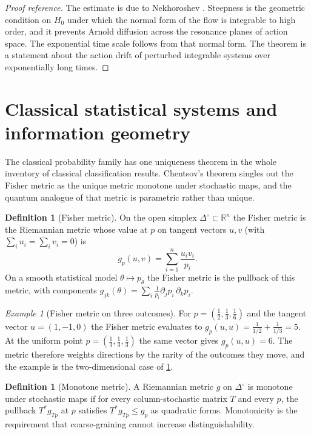 \documentclass[11pt,letterpaper]{article}
\theoremstyle{definition}
\newtheorem{definition}[theorem]{Definition}
\theoremstyle{remark}
\newtheorem{example}[theorem]{Example}
\begin{document}
\begin{proof}[Proof reference]
The estimate is due to Nekhoroshev \cite{nekhoroshev}. Steepness is the geometric condition on $H_0$ under which the normal form of the flow is integrable to high order, and it prevents Arnold diffusion across the resonance planes of action space. The exponential time scale follows from that normal form. The theorem is a statement about the action drift of perturbed integrable systems over exponentially long times.
\end{proof}

\section{Classical statistical systems and information geometry}

The classical probability family has one uniqueness theorem in the whole inventory of classical classification results. Chentsov's theorem singles out the Fisher metric as the unique metric monotone under stochastic maps, and the quantum analogue of that metric is parametric rather than unique.

\begin{definition}[Fisher metric]
\label{def:fisher}
On the open simplex $\Delta^{\circ} \subset \mathbb{R}^{n}$ the Fisher metric is the Riemannian metric whose value at $p$ on tangent vectors $u, v$ (with $\sum_i u_i = \sum_i v_i = 0$) is
\[
g_{p}(u, v) = \sum_{i=1}^{n} \frac{u_i v_i}{p_i}.
\]
On a smooth statistical model $\theta \mapsto p_{\theta}$ the Fisher metric is the pullback of this metric, with components $g_{jk}(\theta) = \sum_i \frac{1}{p_i} \partial_j p_i \, \partial_k p_i$.
\end{definition}

\begin{example}[Fisher metric on three outcomes]
\label{ex:fisher-three}
For $p = (\tfrac{1}{2}, \tfrac{1}{3}, \tfrac{1}{6})$ and the tangent vector $u = (1, -1, 0)$ the Fisher metric evaluates to $g_p(u, u) = \frac{1}{1/2} + \frac{1}{1/3} = 5$. At the uniform point $p = (\tfrac{1}{3}, \tfrac{1}{3}, \tfrac{1}{3})$ the same vector gives $g_p(u, u) = 6$. The metric therefore weights directions by the rarity of the outcomes they move, and the example is the two-dimensional case of \cref{def:fisher}.
\end{example}

\begin{definition}[Monotone metric]
\label{def:monotone}
A Riemannian metric $g$ on $\Delta^{\circ}$ is monotone under stochastic maps if for every column-stochastic matrix $T$ and every $p$, the pullback $T^{*} g_{Tp}$ at $p$ satisfies $T^{*} g_{Tp} \leq g_{p}$ as quadratic forms. Monotonicity is the requirement that coarse-graining cannot increase distinguishability.
\end{definition}
\end{document}
